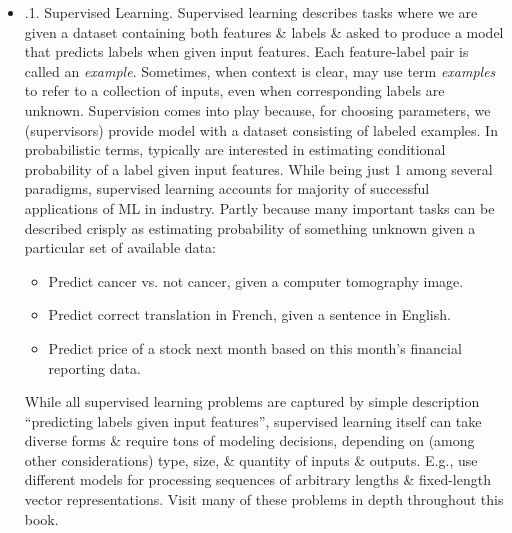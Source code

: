 \documentclass{article}
\begin{document}
\begin{enumerate}
\begin{itemize}
\begin{itemize}
			\begin{itemize}
				\item {.1. Supervised Learning.} Supervised learning describes tasks where we are given a dataset containing both features \& labels \& asked to produce a model that predicts labels when given input features. Each feature-label pair is called an {\it example}. Sometimes, when context is clear, may use term {\it examples} to refer to a collection of inputs, even when corresponding labels are unknown. Supervision comes into play because, for choosing parameters, we (supervisors) provide model with a dataset consisting of labeled examples. In probabilistic terms, typically are interested in estimating conditional probability of a label given input features. While being just 1 among several paradigms, supervised learning accounts for majority of successful applications of ML in industry. Partly because many important tasks can be described crisply as estimating probability of something unknown given a particular set of available data:
				\begin{itemize}
					\item Predict cancer vs. not cancer, given a computer tomography image.
					\item Predict correct translation in French, given a sentence in English.
					\item Predict price of a stock next month based on this month's financial reporting data.
				\end{itemize}
				While all supervised learning problems are captured by simple description ``predicting labels given input features'', supervised learning itself can take diverse forms \& require tons of modeling decisions, depending on (among other considerations) type, size, \& quantity of inputs \& outputs. E.g., use different models for processing sequences of arbitrary lengths \& fixed-length vector representations. Visit many of these problems in depth throughout this book.
				

\end{itemize}
\end{itemize}
\end{itemize}
\end{enumerate}
\end{document}
